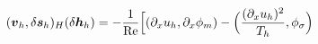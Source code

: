 \documentclass[preview]{standalone}
\newcommand{\bv}{\boldsymbol{v}_h}
\newcommand{\dbh}{\delta\boldsymbol{h}_h}
\newcommand{\dbs}{\delta\boldsymbol{s}_h}
\newcommand{\dx}{\partial_x}
\begin{document}
\begin{align*}
\special{dvisvgm:raw <g id='unique000'>}(\bv,\dbs)_H(\dbh)=-\frac{1}{\mathrm{Re}}\Big[(\dx u_h,\dx\phi_m)-\Big(\frac{(\dx u_h)^2}{T_h},\phi_\sigma\Big)\special{dvisvgm:raw </g>}
\end{align*}
\end{document}
